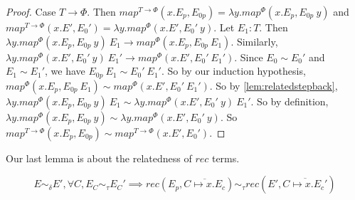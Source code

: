 \begin{proof}
  Case $T \to \Phi$.
  Then $map^{T \to \Phi}(x. E_p, E_{0p}) = \lambda y.map^\Phi(x.E_p, E_{0p}\ y)$ and $map^{T \to \Phi}(x. E', E_0') = \lambda y.map^\Phi(x.E', E_0'\ y)$.
  Let $E_1 : T$.
  Then $\lambda y.map^\Phi(x.E_p, E_{0p}\ y)\ E_1 \to map^\Phi(x.E_p, E_{0p}\ E_1)$.
  Similarly, $\lambda y.map^\Phi(x.E', E_0'\ y)\ E_1' \to map^\Phi(x. E', E_0'\ E_1')$.
  Since $E_0 \sim E_0'$ and $E_1 \sim E_1'$, we have $E_{0p}\ E_1 \sim E_0'\ E_1'$.
  So by our induction hypothesis, $map^\Phi(x.E_p, E_{0p}\ E_1) \sim map^\Phi(x. E', E_0'\ E_1')$.
  So by \ref{lem:relatedstepback}, $\lambda y.map^\Phi(x.E_p, E_{0p}\ y)\ E_1 \sim \lambda y.map^\Phi(x.E', E_0'\ y)\ E_1'$.
  So by definition, $\lambda y.map^\Phi(x.E_p, E_{0p}\ y) \sim \lambda y.map^\Phi(x.E', E_0'\ y)$.
  So $map^{T \to \Phi}(x. E_p, E_{0p}) \sim map^{T \to \Phi}(x. E', E_0')$.
\end{proof}
%
Our last lemma is about the relatedness of $rec$ terms.
%
\begin{lemma}
  \label{lem:relatedrec}
  \[ E \sim_\delta E', \forall C, E_C \sim_\tau E_C' \implies rec(E_p, \overline{C \mapsto x.E_c}) \sim_\tau rec(E', \overline{C \mapsto x.E_c'}) \]
\end{lemma}
%
